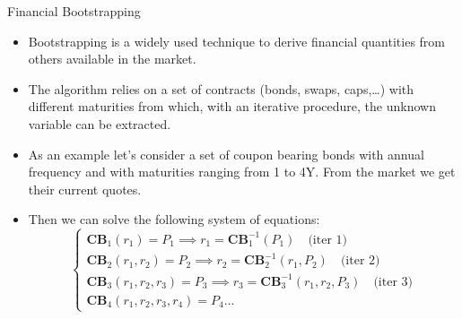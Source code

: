 \documentclass{beamer}
\begin{document}
\begin{frame}{Financial Bootstrapping}
	\begin{itemize}
		\item Bootstrapping is a widely used technique to derive financial quantities from others available in the market.
		\item The algorithm relies on a set of contracts (bonds, swaps, caps,\ldots) with different maturities from which, with an iterative procedure, the unknown variable can be extracted.
		\item As an example let's consider a set of coupon bearing bonds with annual frequency and with maturities ranging from 1 to 4Y. From the market we get their current quotes.
		\item Then we can solve the following system of equations:
		\begin{equation*}
			\begin{cases}
			\textbf{CB}_1(r_1) = P_1 \implies r_1 = \textbf{CB}_1^{-1}(P_1)\quad\text{(iter 1)}\\
			\textbf{CB}_2(r_1, r_2) = P_2 \implies r_2 = \textbf{CB}_2^{-1}(r_1, P_2)\quad\text{(iter 2)} \\
			\textbf{CB}_3(r_1, r_2, r_3) = P_3 \implies r_3 = \textbf{CB}_3^{-1}(r_1, r_2, P_3)\quad\text{(iter 3)} \\
			\textbf{CB}_4(r_1, r_2, r_3, r_4) = P_4 \ldots
			\end{cases}
		\end{equation*}
	\end{itemize}
\end{frame}
\end{document}
